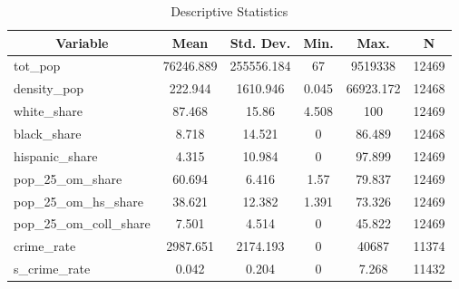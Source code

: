 
\begin{table}[htbp]\centering \caption{Descriptive Statistics \label{desc_stat_tab_3}}
\begin{tabular}{l c c c c c}\hline\hline
\multicolumn{1}{c}{\textbf{Variable}} & \textbf{Mean}
 & \textbf{Std. Dev.}& \textbf{Min.} &  \textbf{Max.} & \textbf{N}\\ \hline
tot\_pop & 76246.889 & 255556.184 & 67 & 9519338 & 12469\\
density\_pop & 222.944 & 1610.946 & 0.045 & 66923.172 & 12468\\
white\_share & 87.468 & 15.86 & 4.508 & 100 & 12469\\
black\_share & 8.718 & 14.521 & 0 & 86.489 & 12468\\
hispanic\_share & 4.315 & 10.984 & 0 & 97.899 & 12469\\
pop\_25\_om\_share & 60.694 & 6.416 & 1.57 & 79.837 & 12469\\
pop\_25\_om\_hs\_share & 38.621 & 12.382 & 1.391 & 73.326 & 12469\\
pop\_25\_om\_coll\_share & 7.501 & 4.514 & 0 & 45.822 & 12469\\
crime\_rate & 2987.651 & 2174.193 & 0 & 40687 & 11374\\
s\_crime\_rate & 0.042 & 0.204 & 0 & 7.268 & 11432\\
\hline\end{tabular}
\end{table}
